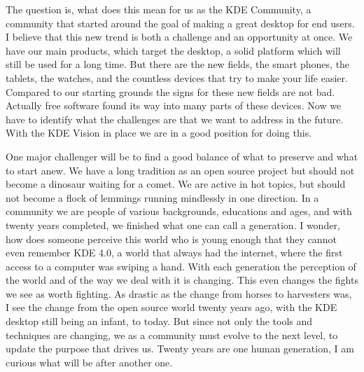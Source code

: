 The question is, what does this mean for us as the KDE Community, a community that started around the goal of making a great desktop for end users. I believe that this new trend is both a challenge and an opportunity at once. We have our main products, which target the desktop, a solid platform which will still be used for a long time. But there are the new fields, the smart phones, the tablets, the watches, and the countless devices that try to make your life easier. Compared to our starting grounds the signs for these new fields are not bad. Actually free software found its way into many parts of these devices. Now we have to identify what the challenges are that we want to address in the future. With the KDE Vision in place we are in a good position for doing this.

One major challenger will be to find a good balance of what to preserve and what to start anew. We have a long tradition as an open source project but should not become a dinosaur waiting for a comet. We are active in hot topics, but should not become a flock of lemmings running mindlessly in one direction. In a community we are people of various backgrounds, educations and ages, and with twenty years completed, we finished what one can call a generation. I wonder, how does someone perceive this world who is young enough that they cannot even remember KDE 4.0, a world that always had the internet, where the first access to a computer was swiping a hand. With each generation the perception of the world and of the way we deal with it is changing. This even changes the fights we see as worth fighting. As drastic as the change from horses to harvesters was, I see the change from the open source world twenty years ago, with the KDE desktop still being an infant, to today. But since not only the tools and techniques are changing, we as a community must evolve to the next level, to update the purpose that drives us. Twenty years are one human generation, I am curious what will be after another one.
